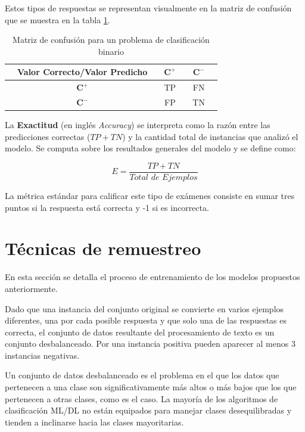 Estos tipos de respuestas se representan visualmente en la matriz de confusión que se muestra en la tabla \ref{tab:confusion}.

\begin{table}[h!]
  \caption{Matriz de confusión para un problema de clasificación binario}
  \begin{center}
    \begin{tabular}{ccc|cc|cc}
        & Valor Correcto/Valor Predicho &    & $\mathbf{C}^{\boldsymbol{+}}$ & & $\mathbf{C}^{\boldsymbol{-}}$  \\
        \hline
        & $\mathbf{C}^{\boldsymbol{+}}$ &   & TP & & FN  \\
        \hline
        & $\mathbf{C}^{\boldsymbol{-}}$ &   & FP & & TN  \\
    \end{tabular}
  \end{center}
  \label{tab:confusion}
\end{table}

La \textbf{Exactitud} (en inglés \textit{Accuracy}) se interpreta como la razón entre las predicciones correctas ($TP + TN$) y la cantidad total de instancias que analizó el modelo. Se computa sobre los resultados generales del modelo y se define como:

\begin{equation}
  E = \frac{TP + TN}{\textit{Total de Ejemplos}}
\end{equation}

La métrica estándar para calificar este tipo de exámenes consiste en sumar tres puntos si la respuesta está correcta y -1 si es incorrecta.

\section{Técnicas de remuestreo}

En esta sección se detalla el proceso de entrenamiento de los modelos propuestos anteriormente. 

Dado que una instancia del conjunto original se convierte en varios ejemplos diferentes, una por cada posible respuesta y que solo una de las respuestas es correcta, el conjunto de datos resultante del procesamiento de texto es un conjunto desbalanceado. Por una instancia positiva pueden aparecer al menos 3 instancias negativas.

Un conjunto de datos desbalanceado es el problema en el que los datos que pertenecen a una clase son significativamente más altos o más bajos que los que pertenecen a otras clases, como es el caso. La mayoría de los algoritmos de clasificación ML/DL no están equipados para manejar clases desequilibradas y tienden a inclinarse hacia las clases mayoritarias.


